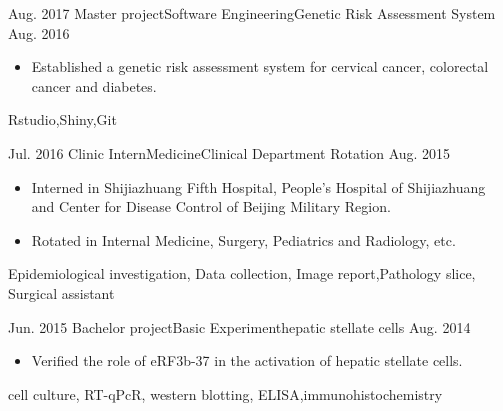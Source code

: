 \begin{experiences}
  \emptySeparator
  \experience
  {Aug. 2017} {Master project}{Software Engineering}{Genetic Risk Assessment System}
  {Aug. 2016}    {
				  	\begin{itemize}
				  		\item Established a genetic risk assessment system for cervical cancer, colorectal cancer and diabetes.
				  	\end{itemize}
				  }
				      {Rstudio,Shiny,Git}
				  
  \emptySeparator
  \experience
  {Jul. 2016} {Clinic Intern}{Medicine}{Clinical Department Rotation}
  {Aug. 2015}    {
  	\begin{itemize}
  		\item Interned in Shijiazhuang Fifth Hospital, People's Hospital of Shijiazhuang and Center for Disease Control of Beijing Military Region.
  		\item  Rotated in Internal Medicine, Surgery, Pediatrics and Radiology, etc.
  	\end{itemize}
  }
      {Epidemiological investigation, Data collection, Image report,Pathology slice, Surgical assistant}

  \emptySeparator
  \experience
    {Jun. 2015} {Bachelor project}{Basic Experiment}{hepatic stellate cells}
    {Aug. 2014}    {
                      \begin{itemize}
                        \item Verified the role of eRF3b-37 in the activation of hepatic stellate cells.
                      \end{itemize}
                    }
                       {cell culture, RT-qPcR, western blotting, ELISA,immunohistochemistry}

\end{experiences}

